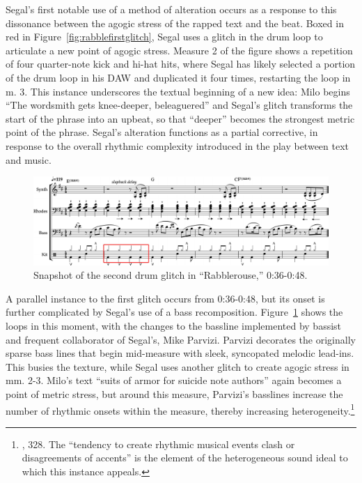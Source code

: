 Segal's first notable use of a method of alteration occurs as a response to this dissonance between the agogic stress of the rapped text and the beat. Boxed in red in Figure~\ref{fig:rabblefirstglitch}, Segal uses a glitch in the drum loop to articulate a new point of agogic stress. Measure 2 of the figure shows a repetition of four quarter-note kick and hi-hat hits, where Segal has likely selected a portion of the drum loop in his DAW and duplicated it four times, restarting the loop in m. 3. This instance underscores the textual beginning of a new idea: Milo begins ``The wordsmith gets knee-deeper, beleaguered'' and Segal's glitch transforms the start of the phrase into an upbeat, so that ``deeper'' becomes the strongest metric point of the phrase. Segal's alteration functions as a partial corrective, in response to the overall rhythmic complexity introduced in the play between text and music.

    \begin{figure}[ht]
        \centering
        \includegraphics[width=\textwidth]{images/figures/chp 02/036048rabblesecondglitch.pdf}
        \caption{Snapshot of the second drum glitch in ``Rabblerouse,'' 0:36-0:48.}
        \label{fig:rabblesecondglitch}
    \end{figure}

A parallel instance to the first glitch occurs from 0:36-0:48, but its onset is further complicated by Segal's use of a bass recomposition. Figure~\ref{fig:rabblesecondglitch} shows the loops in this moment, with the changes to the bassline implemented by bassist and frequent collaborator of Segal's, Mike Parvizi. Parvizi decorates the originally sparse bass lines that begin mid-measure with sleek, syncopated melodic lead-ins. This busies the texture, while Segal uses another glitch to create agogic stress in mm. 2-3. Milo's text \textemdash  ``suits of armor for suicide note authors'' \textemdash again becomes a point of metric stress, but around this measure, Parvizi's basslines increase the number of rhythmic onsets within the measure, thereby increasing heterogeneity.\footnote{\cite{ollywilsonHeterogeneousSoundIdeal1992}, 328. The ``tendency to create rhythmic musical events clash or disagreements of accents'' is the element of the heterogeneous sound ideal to which this instance appeals.}

